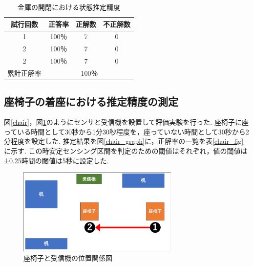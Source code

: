 \documentclass[Japanese]{dicomopapers}
\begin{document}
\begin{table}[htb]
    \begin{center}
        \caption{金庫の開閉における状態推定精度}
        \label{kinko_fig}
        \begin{tabular}{|c|c|c|c|} \hline
        試行回数 & 正答率 & 正解数 & 不正解数 \\ \hline
        1 & 100％ & 7 & 0 \\ \hline
        2 & 100％ & 7 & 0 \\ \hline
        2 & 100％ & 7 & 0 \\ \hline \hline
        累計正解率 & \multicolumn{3}{c|}{100％} \\ \hline
        \end{tabular}
    \end{center}
\end{table}



\subsection{座椅子の着座における推定精度の測定}

図\ref{chair}，図\ref{zaisu_position}のようにセンサと受信機を設置して評価実験を行った.
座椅子に座っている時間として30秒から1分30秒程度を，座っていない時間として30秒から2分程度を設定した.
推定結果を図\ref{chair_graph}に，正解率の一覧を表\ref{chair_fig}に示す.
この時安定センシング区間を判定のための閾値はそれぞれ，値の閾値は±0.25時間の閾値は5秒に設定した.


\begin{figure}[h]
    \centering
    \includegraphics[width=8cm]{zaisu_position.png}
    \caption{座椅子と受信機の位置関係図}
    \label{zaisu_position}
\end{figure}
\end{document}
